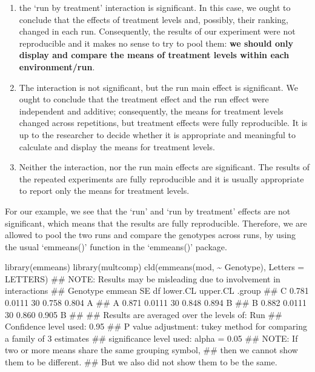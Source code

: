 \documentclass[a4paper,12pt,oneside]{book}
\providecommand{\tightlist}{%
  \setlength{\itemsep}{0pt}\setlength{\parskip}{0pt}}
\newenvironment{Shaded}{\begin{snugshade}}{\end{snugshade}}
\newcommand{\SpecialCharTok}[1]{#1}
\newcommand{\DocumentationTok}[1]{#1}
\newcommand{\FunctionTok}[1]{#1}
\newcommand{\AttributeTok}[1]{#1}
\newcommand{\AlertTok}[1]{#1}
\newcommand{\NormalTok}[1]{#1}
\begin{document}
\begin{enumerate}
\def\labelenumi{\arabic{enumi}.}
\tightlist
\item
  the `run by treatment' interaction is significant. In this case, we ought to conclude that the effects of treatment levels and, possibly, their ranking, changed in each run. Consequently, the results of our experiment were not reproducible and it makes no sense to try to pool them: \textbf{we should only display and compare the means of treatment levels within each environment/run}.
\item
  The interaction is not significant, but the run main effect is significant. We ought to conclude that the treatment effect and the run effect were independent and additive; consequently, the means for treatment levels changed across repetitions, but treatment effects were fully reproducible. It is up to the researcher to decide whether it is appropriate and meaningful to calculate and display the means for treatment levels.
\item
  Neither the interaction, nor the run main effects are significant. The results of the repeated experiments are fully reproducible and it is usually appropriate to report only the means for treatment levels.
\end{enumerate}

For our example, we see that the `run' and `run by treatment' effects are not significant, which means that the results are fully reproducible. Therefore, we are allowed to pool the two runs and compare the genotypes across runs, by using the usual `emmeans()' function in the `emmeans()' package.

\begin{Shaded}
\begin{Highlighting}[]
\FunctionTok{library}\NormalTok{(emmeans)}
\FunctionTok{library}\NormalTok{(multcomp)}
\FunctionTok{cld}\NormalTok{(}\FunctionTok{emmeans}\NormalTok{(mod, }\SpecialCharTok{\textasciitilde{}}\NormalTok{ Genotype), }\AttributeTok{Letters =}\NormalTok{ LETTERS)}
\DocumentationTok{\#\# }\AlertTok{NOTE}\DocumentationTok{: Results may be misleading due to involvement in interactions}
\DocumentationTok{\#\#  Genotype emmean     SE df lower.CL upper.CL .group}
\DocumentationTok{\#\#  C         0.781 0.0111 30    0.758    0.804  A    }
\DocumentationTok{\#\#  A         0.871 0.0111 30    0.848    0.894   B   }
\DocumentationTok{\#\#  B         0.882 0.0111 30    0.860    0.905   B   }
\DocumentationTok{\#\# }
\DocumentationTok{\#\# Results are averaged over the levels of: Run }
\DocumentationTok{\#\# Confidence level used: 0.95 }
\DocumentationTok{\#\# P value adjustment: tukey method for comparing a family of 3 estimates }
\DocumentationTok{\#\# significance level used: alpha = 0.05 }
\DocumentationTok{\#\# }\AlertTok{NOTE}\DocumentationTok{: If two or more means share the same grouping symbol,}
\DocumentationTok{\#\#       then we cannot show them to be different.}
\DocumentationTok{\#\#       But we also did not show them to be the same.}
\end{Highlighting}
\end{Shaded}
\end{document}
